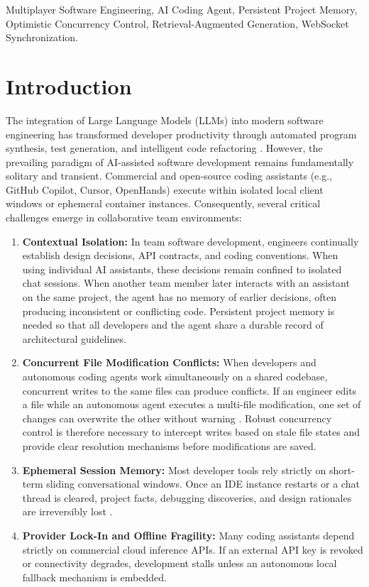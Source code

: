 \documentclass[conference]{IEEEtran}
\begin{document}
\begin{IEEEkeywords}
Multiplayer Software Engineering, AI Coding Agent, Persistent Project Memory, Optimistic Concurrency Control, Retrieval-Augmented Generation, WebSocket Synchronization.
\end{IEEEkeywords}

\section{Introduction}

The integration of Large Language Models (LLMs) into modern software engineering has transformed developer productivity through automated program synthesis, test generation, and intelligent code refactoring \cite{chen2021evaluating, ziegler2024measuring, ross2023programmer}. However, the prevailing paradigm of AI-assisted software development remains fundamentally solitary and transient. Commercial and open-source coding assistants (e.g., GitHub Copilot, Cursor, OpenHands) execute within isolated local client windows or ephemeral container instances. Consequently, several critical challenges emerge in collaborative team environments:

\begin{enumerate}
    \item \textbf{Contextual Isolation:} In team software development, engineers continually establish design decisions, API contracts, and coding conventions. When using individual AI assistants, these decisions remain confined to isolated chat sessions. When another team member later interacts with an assistant on the same project, the agent has no memory of earlier decisions, often producing inconsistent or conflicting code. Persistent project memory is needed so that all developers and the agent share a durable record of architectural guidelines.
    \item \textbf{Concurrent File Modification Conflicts:} When developers and autonomous coding agents work simultaneously on a shared codebase, concurrent writes to the same files can produce conflicts. If an engineer edits a file while an autonomous agent executes a multi-file modification, one set of changes can overwrite the other without warning \cite{kung1981optimistic, ellis1989concurrency}. Robust concurrency control is therefore necessary to intercept writes based on stale file states and provide clear resolution mechanisms before modifications are saved.
    \item \textbf{Ephemeral Session Memory:} Most developer tools rely strictly on short-term sliding conversational windows. Once an IDE instance restarts or a chat thread is cleared, project facts, debugging discoveries, and design rationales are irreversibly lost \cite{xia2023keep}.
    \item \textbf{Provider Lock-In and Offline Fragility:} Many coding assistants depend strictly on commercial cloud inference APIs. If an external API key is revoked or connectivity degrades, development stalls unless an autonomous local fallback mechanism is embedded.
\end{enumerate}
\end{document}
